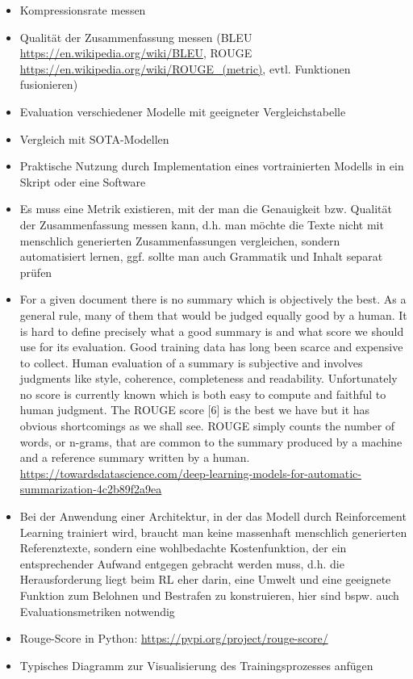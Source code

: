 \begin{itemize}
	\item Kompressionsrate messen
	\item Qualität der Zusammenfassung messen (BLEU \url{https://en.wikipedia.org/wiki/BLEU}, ROUGE \url{https://en.wikipedia.org/wiki/ROUGE_(metric)}, evtl. Funktionen fusionieren)
	\item Evaluation verschiedener Modelle mit geeigneter Vergleichstabelle
	\item Vergleich mit SOTA-Modellen
	\item Praktische Nutzung durch Implementation eines vortrainierten Modells in ein Skript oder eine Software
	\item Es muss eine Metrik existieren, mit der man die Genauigkeit bzw. Qualität der Zusammenfassung messen kann, d.h. man möchte die Texte nicht mit menschlich generierten Zusammenfassungen vergleichen, sondern automatisiert lernen, ggf. sollte man auch Grammatik und Inhalt separat prüfen
	\item For a given document there is no summary which is objectively the best. As a general rule, many of them that would be judged equally good by a human. It is hard to define precisely what a good summary is and what score we should use for its evaluation. Good training data has long been scarce and expensive to collect. Human evaluation of a summary is subjective and involves judgments like style, coherence, completeness and readability. Unfortunately no score is currently known which is both easy to compute and faithful to human judgment. The ROUGE score [6] is the best we have but it has obvious shortcomings as we shall see. ROUGE simply counts the number of words, or n-grams, that are common to the summary produced by a machine and a reference summary written by a human. \url{https://towardsdatascience.com/deep-learning-models-for-automatic-summarization-4c2b89f2a9ea}
	\item Bei der Anwendung einer Architektur, in der das Modell durch Reinforcement Learning trainiert wird, braucht man keine massenhaft menschlich generierten Referenztexte, sondern eine wohlbedachte Kostenfunktion, der ein entsprechender Aufwand entgegen gebracht werden muss, d.h. die Herausforderung liegt beim RL eher darin, eine Umwelt und eine geeignete Funktion zum Belohnen und Bestrafen zu konstruieren, hier sind bspw. auch Evaluationsmetriken notwendig
	\item Rouge-Score in Python: \url{https://pypi.org/project/rouge-score/}
	\item Typisches Diagramm zur Visualisierung des Trainingsprozesses anfügen
\end{itemize}
